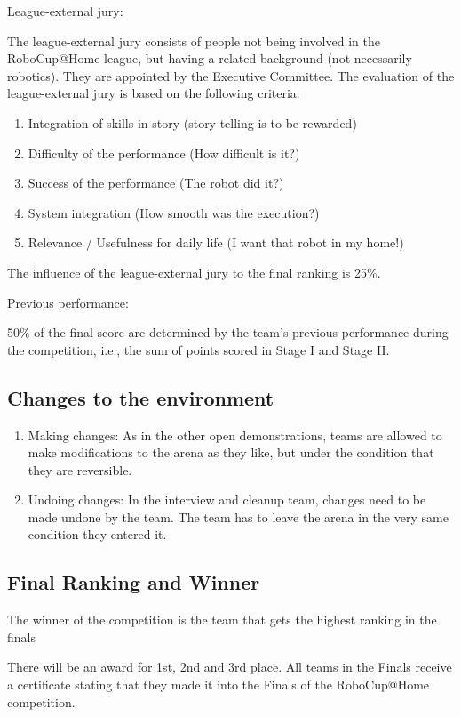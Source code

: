 \begin{enumerate}
  {\bf\item League-external jury:} The league-external jury consists of people not being involved in the RoboCup@Home league, but having a related background (not necessarily robotics). They are appointed by the Executive Committee. The evaluation of the league-external jury is based on the following criteria:
  \begin{enumerate}
    \item Integration of skills in story (story-telling is to be rewarded)
    \item Difficulty of the performance (How difficult is it?)
    \item Success of the performance (The robot did it?)
    \item System integration (How smooth was the execution?)
    \item Relevance / Usefulness for daily life (I want that robot in my home!)
  \end{enumerate}

  The influence of the league-external jury to the final ranking is 25\%. \\

  {\bf\item Previous performance:} 50\% of the final score are determined by the team's previous performance during the competition, i.e., the sum of points scored in Stage I and Stage II.
\end{enumerate}

\subsection{Changes to the environment}
\begin{enumerate}
  \item Making changes: As in the other open demonstrations, teams are allowed to make modifications to the arena as they like, but under the condition that they are reversible.
  \item Undoing changes: In the interview and cleanup team, changes need to be made undone by the team. The team has to leave the arena in the very same condition they entered it.
\end{enumerate}

\subsection{Final Ranking and Winner}
The winner of the competition is the team that gets the highest ranking in the finals

There will be an award for 1st, 2nd and 3rd place. All teams in the Finals receive a certificate stating that they made it into the Finals of the RoboCup@Home competition.
